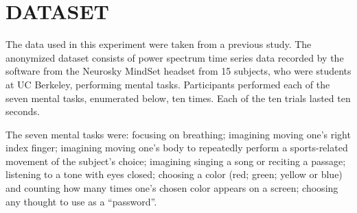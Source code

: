 
\section{\uppercase{Dataset}}

The data used in this experiment were taken from a previous study. The anonymized dataset consists of power spectrum time series data recorded by the software from the Neurosky MindSet headset from 15 subjects, who were students at UC Berkeley, performing mental tasks. Participants performed each of the seven mental tasks, enumerated below, ten times. Each of the ten trials lasted ten seconds.

The seven mental tasks were: focusing on breathing; imagining moving one's right index finger; imagining moving one's body to repeatedly perform a sports-related movement of the subject's choice; imagining singing a song or reciting a passage; listening to a tone with eyes closed; choosing a color (red; green; yellow or blue) and counting how many times one's chosen color appears on a screen; choosing any thought to use as a ``password''.
